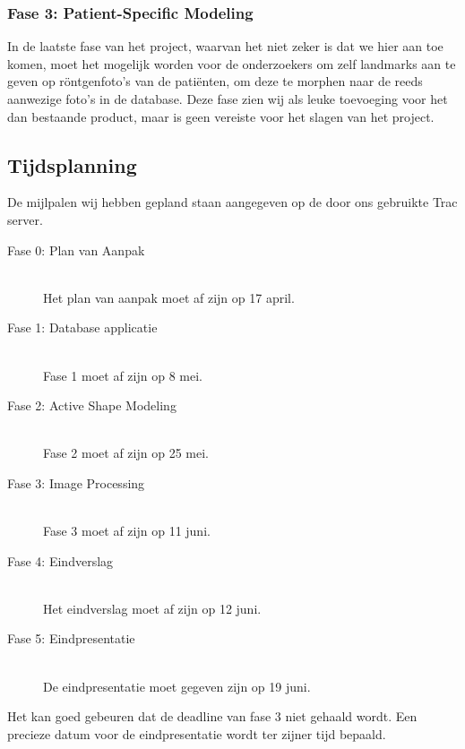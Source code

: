 \subsubsection{Fase 3: Patient-Specific Modeling}
In de laatste fase van het project, waarvan het niet zeker is dat we hier aan toe komen, moet het mogelijk worden voor de onderzoekers om zelf landmarks aan te geven op r\"ontgenfoto's van de pati\"enten, om deze te morphen naar de reeds aanwezige foto's in de database. Deze fase zien wij als leuke toevoeging voor het dan bestaande product, maar is geen vereiste voor het slagen van het project.

\subsection{Tijdsplanning}




De mijlpalen wij hebben gepland staan aangegeven op de door ons gebruikte Trac\cite{trac} server.
\begin{description}
	\item[Fase 0: Plan van Aanpak]\hspace*{\fill} \\
Het plan van aanpak moet af zijn op 17 april.

	\item[Fase 1: Database applicatie]\hspace*{\fill} \\
Fase 1 moet af zijn op 8 mei.

	\item[Fase 2: Active Shape Modeling]\hspace*{\fill} \\
Fase 2 moet af zijn op 25 mei.

	\item[Fase 3: Image Processing]\hspace*{\fill} \\
Fase 3 moet af zijn op 11 juni.

	\item[Fase 4: Eindverslag]\hspace*{\fill} \\
Het eindverslag moet af zijn op 12 juni.

	\item[Fase 5: Eindpresentatie]\hspace*{\fill} \\
De eindpresentatie moet gegeven zijn op 19 juni.

\end{description}
Het kan goed gebeuren dat de deadline van fase 3 niet gehaald wordt.
Een precieze datum voor de eindpresentatie wordt ter zijner tijd bepaald.

